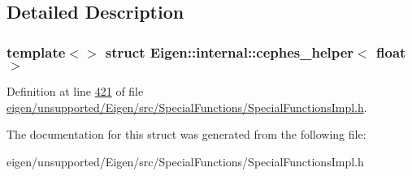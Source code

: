 \subsection{Detailed Description}
\subsubsection*{template$<$$>$\newline
struct Eigen\+::internal\+::cephes\+\_\+helper$<$ float $>$}



Definition at line \hyperlink{eigen_2unsupported_2_eigen_2src_2_special_functions_2_special_functions_impl_8h_source_l00421}{421} of file \hyperlink{eigen_2unsupported_2_eigen_2src_2_special_functions_2_special_functions_impl_8h_source}{eigen/unsupported/\+Eigen/src/\+Special\+Functions/\+Special\+Functions\+Impl.\+h}.



The documentation for this struct was generated from the following file\+:\begin{DoxyCompactItemize}
\item 
eigen/unsupported/\+Eigen/src/\+Special\+Functions/\+Special\+Functions\+Impl.\+h\end{DoxyCompactItemize}
